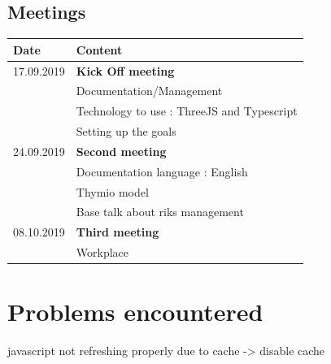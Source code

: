 \documentclass{scrartcl}
\begin{document}
\subsection{Meetings}
\begin{tabular}{ | m{3cm} | m{10cm} | }
  \hline
  Date & Content \\
  \hline
  17.09.2019 & \textbf{Kick Off meeting}\\
  & Documentation/Management\\
  & Technology to use : ThreeJS and Typescript\\
  & Setting up the goals\\
  \hline
  24.09.2019 & \textbf{Second meeting} \\
  & Documentation language : English \\
  & Thymio model \\
  & Base talk about riks management \\
  \hline
  08.10.2019 & \textbf{Third meeting}\\
  & Workplace\\
  \hline
\end{tabular}

\listoffigures

\listoftables

\section{Problems encountered}
javascript not refreshing properly due to cache -> disable cache

\printbibliography[heading=bibintoc]
\end{document}
